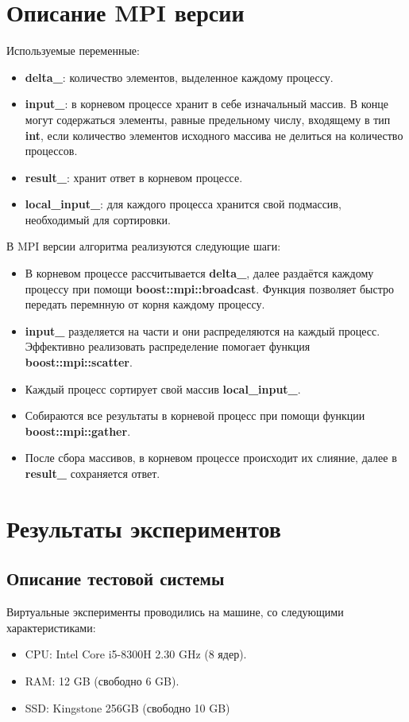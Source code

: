 \documentclass[12pt]{article}
\begin{document}
\newpage
\section{Описание MPI версии}
Используемые переменные:
\begin{itemize}
    \item \textbf{delta\_}: количество элементов, выделенное каждому процессу.
    \item \textbf{input\_}: в корневом процессе хранит в себе изначальный массив. В конце могут содержаться элементы, равные предельному числу, входящему в тип \textbf{int}, если количество элементов исходного массива не делиться на количество процессов. 
    \item \textbf{result\_}: хранит ответ в корневом процессе.
    \item \textbf{local\_input\_}: для каждого процесса хранится свой подмассив, необходимый для сортировки.
\end{itemize}

В MPI версии алгоритма реализуются следующие шаги:
\begin{itemize}
    \item В корневом процессе рассчитывается \textbf{delta\_}, далее раздаётся каждому процессу при помощи \textbf{boost::mpi::broadcast}. Функция позволяет быстро передать перемнную от корня каждому процессу.
    \item \textbf{input\_} разделяется на части и они распределяются на каждый процесс. Эффективно реализовать распределение помогает функция \textbf{boost::mpi::scatter}.
    \item Каждый процесс сортирует свой массив \textbf{local\_input\_}.
    \item Собираются все результаты в корневой процесс при помощи функции \textbf{boost::mpi::gather}.
    \item После сбора массивов, в корневом процессе происходит их слияние, далее в \textbf{result\_} сохраняется ответ.
\end{itemize}

\newpage
\section{Результаты экспериментов}

\subsection{Описание тестовой системы}
Виртуальные эксперименты проводились на машине, со следующими характеристиками:
\begin{itemize}
    \item CPU: Intel Core i5-8300H 2.30 GHz (8 ядер).
    \item RAM: 12 GB (свободно 6 GB).
    \item SSD: Kingstone 256GB (свободно 10 GB)
\end{itemize}
\end{document}
